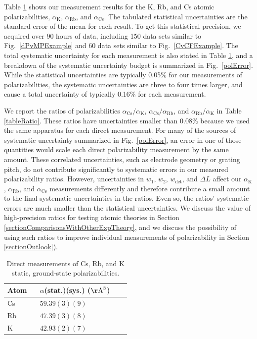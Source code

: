 \documentclass[twocolumn,pra,showpacs,superscriptaddress,longbibliography]{revtex4-1}   %
\newcommand{\sspace}{$\enspace$}
\newcommand{\figref}[1]{Fig.~\ref{#1}}
\newcommand{\ak}{\alpha_{\textrm{K}}}
\newcommand{\arb}{\alpha_{\textrm{Rb}}}
\newcommand{\acs}{\alpha_{\textrm{Cs}}}
\newcommand{\polK}{42.93(2)(7)}
\newcommand{\polRb}{47.39(3)(8)}
\newcommand{\polCs}{59.39(3)(9)}
\newcommand{\AAA}{\mathrm{\AA}}
\begin{document}
Table \ref{tableAbs} shows our measurement results for the K, Rb, and Cs atomic polarizabilities, $\ak$, $\arb$, and $\acs$.  The tabulated statistical uncertainties are the standard error of the mean for each result.  To get this statistical precision, we acquired over 90 hours of data, including 150 data sets similar to \figref{dPvMPExample} and 60 data sets similar to \figref{CvCFExample}.   The total systematic uncertainty for each measurement is also stated in Table \ref{tableAbs}, and a breakdown of the systematic uncertainty budget is summarized in \figref{polError}.  While the statistical uncertainties are typically 0.05\% for our measurements of polarizabilities, the systematic uncertainties are three to four times larger, and cause a total uncertainty of typically 0.16\% for each measurement.

We report the ratios of polarizabilities $\acs/\ak$, $\acs/\arb$, and $\arb/\ak$ in Table \ref{tableRatio}.
These ratios have uncertainties smaller than 0.08\% because we used the same apparatus for each direct measurement.
For many of the sources of systematic uncertainty summarized in \figref{polError}, an error in one of those quantities would scale each direct polarizability measurement by the same amount. These correlated uncertainties, such as electrode geometry or grating pitch, do not contribute significantly to systematic errors in our measured polarizability ratios.
However, uncertainties in $w_1$, $w_2$, $w_{\mathrm{det}}$, and $\Delta L$ affect our $\ak$, $\arb$, and $\acs$ measurements differently and therefore contribute a small amount to the final systematic uncertainties in the ratios. Even so, the ratios' systematic errors are much smaller than the statistical uncertainties. 
We discuss the value of high-precision ratios for testing atomic theories in Section \ref{sectionComparisonsWithOtherExpTheory}, and we discuss the possibility of using such ratios to improve individual measurements of polarizability in Section \ref{sectionOutlook}).

\begingroup
\begin{table}
\caption{\label{tableAbs}Direct measurements of Cs, Rb, and K static, ground-state polarizabilities.}
\begin{center}
\begin{tabular}{llll}
\hline\hline
Atom \sspace & $\alpha$(stat.)(sys.) ($\AAA^3$) \\
\hline
Cs & $\polCs$ \\
Rb & $\polRb$ \\
K  & $\polK$ \\
\hline\hline
\end{tabular}
\end{center}
\end{table}
\endgroup
\end{document}
